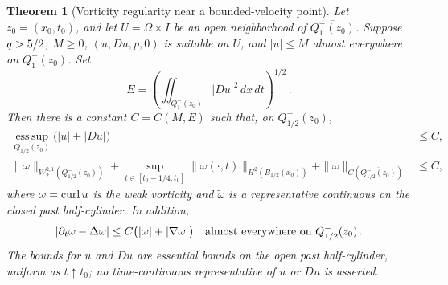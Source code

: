 \documentclass[11pt,letterpaper]{article}
\numberwithin{equation}{section}
\theoremstyle{plain}
\newtheorem{theorem}{Theorem}[section]
\theoremstyle{definition}
\theoremstyle{remark}
\begin{document}
\begin{theorem}[Vorticity regularity near a bounded-velocity point]\label{thm:vorticity-regularity}
Let $z_0=(x_0,t_0)$, and let $U=\Omega\times I$ be an open neighborhood of $\overline{Q_1^-(z_0)}$. Suppose $q>5/2$, $M\ge0$, $(u,Du,p,0)$ is suitable on $U$, and $|u|\le M$ almost everywhere on $Q_1^-(z_0)$. Set
\[
 E=\left(\iint_{Q_1^-(z_0)}|Du|^2\,dx\,dt\right)^{1/2}\,.
\]
Then there is a constant $C=C(M,E)$ such that, on $Q_{1/2}^-(z_0)$,
\begin{align}
 \operatorname*{ess\,sup}_{Q_{1/2}^-(z_0)}\big(|u|+|Du|\big)&\le C,\label{eq:vorticity-regularity-gradient}\\
 \|\omega\|_{W^{2,1}_2(Q_{1/2}^-(z_0))}
 +\sup_{t\in[t_0-1/4,t_0]}\|\widetilde\omega(\cdot,t)\|_{H^2(B_{1/2}(x_0))}
 +\|\widetilde\omega\|_{C(\overline{Q_{1/2}^-(z_0)})}&\le C,
 \label{eq:vorticity-regularity-omega}
\end{align}
where $\omega=\operatorname{curl} u$ is the weak vorticity and $\widetilde\omega$ is a representative continuous on the closed past half-cylinder. In addition,
\begin{equation}\label{eq:vorticity-regularity-inequality}
 |\partial_t\omega-\Delta\omega|
 \le C\big(|\omega|+|\nabla\omega|\big)
 \quad\text{almost everywhere on }Q_{1/2}^-(z_0)\,.
\end{equation}
The bounds for $u$ and $Du$ are essential bounds on the open past half-cylinder, uniform as $t\uparrow t_0$; no time-continuous representative of $u$ or $Du$ is asserted.
\end{theorem}
\end{document}
